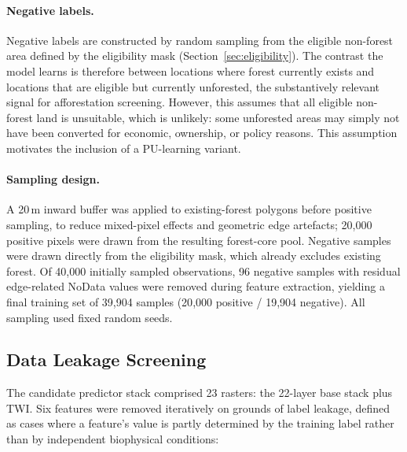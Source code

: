\documentclass[land,article,submit,moreauthors]{Definitions/mdpi}
\begin{document}
\paragraph{Negative labels.}
Negative labels are constructed by random sampling from the eligible non-forest area defined by the eligibility mask (Section~\ref{sec:eligibility}). The contrast the model learns is therefore between locations where forest currently exists and locations that are eligible but currently unforested, the substantively relevant signal for afforestation screening. However, this assumes that all eligible non-forest land is unsuitable, which is unlikely: some unforested areas may simply not have been converted for economic, ownership, or policy reasons. This assumption motivates the inclusion of a PU-learning variant.

\paragraph{Sampling design.}
A 20\,m inward buffer was applied to existing-forest polygons before positive sampling, to reduce mixed-pixel effects and geometric edge artefacts; 20{,}000 positive pixels were drawn from the resulting forest-core pool. Negative samples were drawn directly from the eligibility mask, which already excludes existing forest. Of 40{,}000 initially sampled observations, 96 negative samples with residual edge-related NoData values were removed during feature extraction, yielding a final training set of 39{,}904 samples (20{,}000 positive / 19{,}904 negative). All sampling used fixed random seeds.

\subsection{Data Leakage Screening}
\label{sec:leakage}

The candidate predictor stack comprised 23 rasters: the 22-layer base stack plus TWI. Six features were removed iteratively on grounds of label leakage, defined as cases where a feature's value is partly determined by the training label rather than by independent biophysical conditions:
\end{document}
